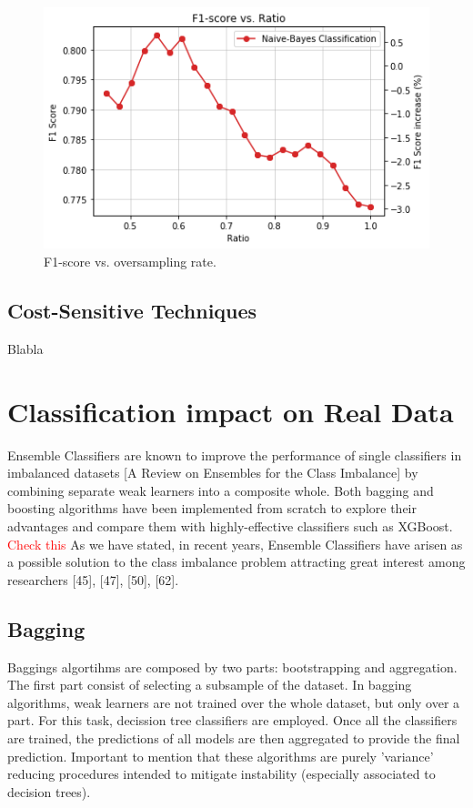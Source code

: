 \documentclass[conference]{IEEEtran}
\begin{document}
	\begin{figure}[h]
		\includegraphics[scale=0.3]{Oversampling_F1_Score}
		\centering
		\caption{F1-score vs. oversampling rate.}
		\label{fig:Oversampling_F1_Score}
	\end{figure}

	\subsection{Cost-Sensitive Techniques}
	Blabla

\section{Classification impact on Real Data}
Ensemble Classifiers are known to improve the performance of single classifiers in imbalanced datasets [A Review on Ensembles for the Class Imbalance] by combining separate weak learners into a composite whole. Both bagging and boosting algorithms have been implemented from scratch to explore their advantages and compare them with highly-effective classifiers such as XGBoost. 
	\textcolor{red}{Check this}
As we have stated, in recent years, Ensemble Classifiers have arisen as a possible solution to the class imbalance problem attracting great interest among researchers [45], [47], [50], [62]. 

	\medskip


\subsection{Bagging}
Baggings algortihms are composed by two parts: bootstrapping and aggregation. The first part consist of selecting a subsample of the dataset. In bagging algorithms, weak learners are not trained over the whole dataset, but only over a part. For this task, decission tree classifiers are employed. Once all the classifiers are trained, the predictions of all models are then aggregated to provide the final prediction. Important to mention that these algorithms are purely 'variance' reducing procedures intended to mitigate instability (especially associated to decision trees). 
\end{document}
